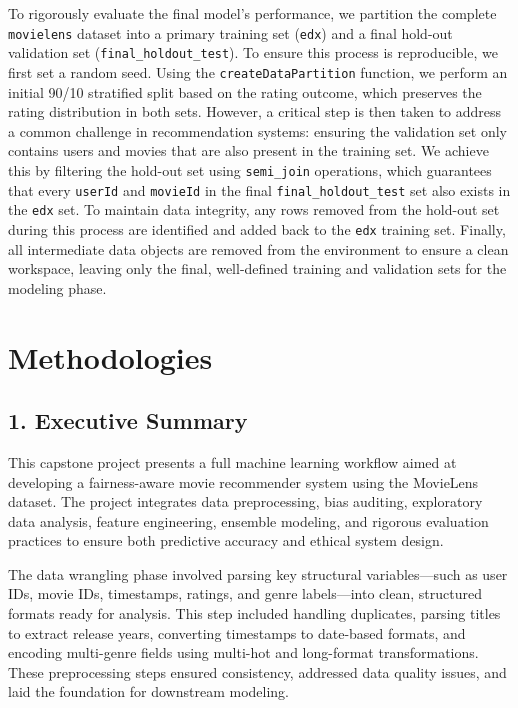 \documentclass[
]{article}
\begin{document}
To rigorously evaluate the final model's performance, we partition the
complete \texttt{movielens} dataset into a primary training set
(\texttt{edx}) and a final hold-out validation set
(\texttt{final\_holdout\_test}). To ensure this process is reproducible,
we first set a random seed. Using the \texttt{createDataPartition}
function, we perform an initial 90/10 stratified split based on the
rating outcome, which preserves the rating distribution in both sets.
However, a critical step is then taken to address a common challenge in
recommendation systems: ensuring the validation set only contains users
and movies that are also present in the training set. We achieve this by
filtering the hold-out set using \texttt{semi\_join} operations, which
guarantees that every \texttt{userId} and \texttt{movieId} in the final
\texttt{final\_holdout\_test} set also exists in the \texttt{edx} set.
To maintain data integrity, any rows removed from the hold-out set
during this process are identified and added back to the \texttt{edx}
training set. Finally, all intermediate data objects are removed from
the environment to ensure a clean workspace, leaving only the final,
well-defined training and validation sets for the modeling phase.

\section{Methodologies}\label{methodologies}

\subsection{1. Executive Summary}\label{executive-summary}

This capstone project presents a full machine learning workflow aimed at
developing a fairness-aware movie recommender system using the MovieLens
dataset. The project integrates data preprocessing, bias auditing,
exploratory data analysis, feature engineering, ensemble modeling, and
rigorous evaluation practices to ensure both predictive accuracy and
ethical system design.

The data wrangling phase involved parsing key structural
variables---such as user IDs, movie IDs, timestamps, ratings, and genre
labels---into clean, structured formats ready for analysis. This step
included handling duplicates, parsing titles to extract release years,
converting timestamps to date-based formats, and encoding multi-genre
fields using multi-hot and long-format transformations. These
preprocessing steps ensured consistency, addressed data quality issues,
and laid the foundation for downstream modeling.
\end{document}
